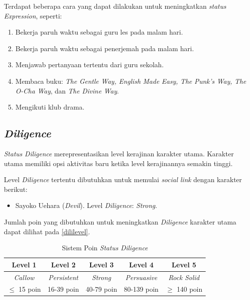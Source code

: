 Terdapat beberapa cara yang dapat dilakukan untuk meningkatkan \textit{status Expression}, seperti:
\begin{enumerate}
    \item Bekerja paruh waktu sebagai guru les pada malam hari.
    \item Bekerja paruh waktu sebagai penerjemah pada malam hari.
    \item Menjawab pertanyaan tertentu dari guru sekolah.
    \item Membaca buku: \textit{The Gentle Way, English Made Easy, The Punk’s Way, The O-Cha Way}, dan \textit{The Divine Way}.
    \item Mengikuti klub drama.
\end{enumerate}

\subsection{\textit{Diligence}}
\textit{Status Diligence} merepresentasikan level kerajinan karakter utama. Karakter utama memiliki opsi aktivitas baru ketika level kerajinannya semakin tinggi.

Level \textit{Diligence} tertentu dibutuhkan untuk memulai \textit{social link} dengan karakter berikut:
\begin{itemize}
    \item Sayoko Uehara (\textit{Devil}). Level \textit{Diligence}: \textit{Strong}.
\end{itemize}

Jumlah poin yang dibutuhkan untuk meningkatkan \textit{Diligence} karakter utama dapat dilihat pada \autoref{dililevel}.
\begin{table}[H]
    \caption{\label{dililevel}Sistem Poin \textit{Status Diligence}}
    \begin{center}
        \begin{tabular}{ | c | c | c | c | c | }
            \hline
            \textbf{Level 1} & \textbf{Level 2}    & \textbf{Level 3} & \textbf{Level 4}    & \textbf{Level 5}    \\
            \hline
            \textit{Callow}  & \textit{Persistent} & \textit{Strong}  & \textit{Persuasive} & \textit{Rock Solid} \\
            \hline
            $\le$ 15 poin    & 16-39 poin          & 40-79 poin       & 80-139 poin         & $\ge$ 140 poin      \\
            \hline
        \end{tabular}
    \end{center}
\end{table}

